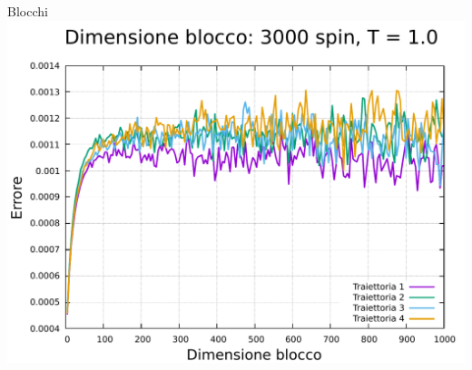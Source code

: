 \begin{frame}
\begin{columns}
\begin{column}{0.33\textwidth}
\begin{block}{Blocchi}
                \centering
                \includegraphics[width=\textwidth]{Immagini/simIsing1D/err_3000_1.0.pdf}
            \end{block}        
        \end{column}
    \end{columns}
\end{frame}



